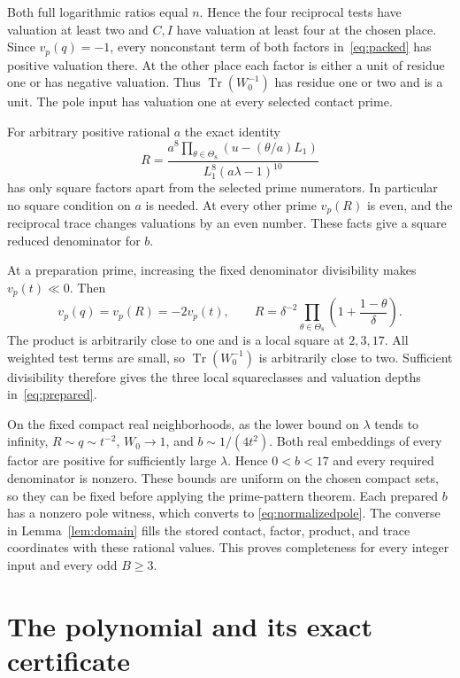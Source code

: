\documentclass[11pt,a4paper]{article}
\DeclareMathOperator{\Tr}{Tr}\DeclareMathOperator{\Nm}{N}
\begin{document}
Both full logarithmic ratios equal $n$. Hence the four reciprocal
tests have valuation at least two and $C,I$ have valuation at least
four at the chosen place. Since $v_p(q)=-1$, every nonconstant term
of both factors in~\eqref{eq:packed} has positive valuation there.
At the other place each factor is either a unit of residue one or has
negative valuation. Thus $\Tr(W_0^{-1})$ has residue one or two and is
a unit. The pole input has valuation one at every selected contact prime.

For arbitrary positive rational $a$ the exact identity
\begin{equation}\label{eq:primeproduct}
 R=\frac{a^8\prod_{\theta\in\Theta_8}(u-(\theta/a)L_1)}
             {L_1^8(a\lambda-1)^{10}}
\end{equation}
has only square factors apart from the selected prime numerators.
In particular no square condition on $a$ is needed. At every other
prime $v_p(R)$ is even, and the reciprocal trace changes valuations
by an even number. These facts give a square reduced denominator for $b$.

At a preparation prime, increasing the fixed denominator divisibility
makes $v_p(t)\ll0$. Then
\[
 v_p(q)=v_p(R)=-2v_p(t),\qquad
 R=\delta^{-2}\prod_{\theta\in\Theta_8}
                   \left(1+\frac{1-\theta}{\delta}\right).
\]
The product is arbitrarily close to one and is a local square at
$2,3,17$. All weighted test terms are small, so $\Tr(W_0^{-1})$ is
arbitrarily close to two. Sufficient divisibility therefore gives the
three local squareclasses and valuation depths in~\eqref{eq:prepared}.

On the fixed compact real neighborhoods, as the lower bound on $\lambda$
tends to infinity, $R\sim q\sim t^{-2}$, $W_0\to1$, and
$b\sim1/(4t^2)$. Both real embeddings of every factor are positive
for sufficiently large $\lambda$. Hence $0<b<17$ and every required
denominator is nonzero. These bounds are uniform on the chosen compact
sets, so they can be fixed before applying the prime-pattern theorem.
Each prepared $b$ has a nonzero pole witness, which converts to
\eqref{eq:normalizedpole}. The converse in Lemma~\ref{lem:domain} fills the stored contact,
factor, product, and trace coordinates with these rational values. This proves completeness for every
integer input and every odd $B\ge3$.

\section{The polynomial and its exact certificate}
\end{document}
